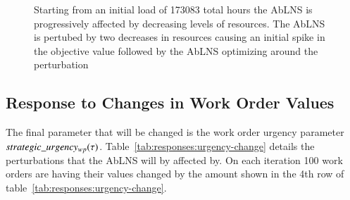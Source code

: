 \begin{figure}[H]%
	\centering
	\resizebox{10cm}{!}{
		
	}
	\caption{Starting from an initial load of 173083 total hours the AbLNS is 
		progressively affected by decreasing levels of resources. The AbLNS is pertubed by two decreases
		in resources causing an initial spike in the objective value followed 
		by the AbLNS optimizing around the perturbation
	}\label{fig:responses:resource-subtraction}
\end{figure}

\subsection{Response to Changes in Work Order Values}\label{sec:results:strategic_value_changes}
The final parameter that will be changed is the work order urgency parameter
$strategic\_urgency_{w p}(\tau)$. Table~\ref{tab:responses:urgency-change} details the
perturbations that the AbLNS will by affected by. On each iteration 100 work
orders are having their values changed by the amount  shown in the 4th row of
table~\ref{tab:responses:urgency-change}.

